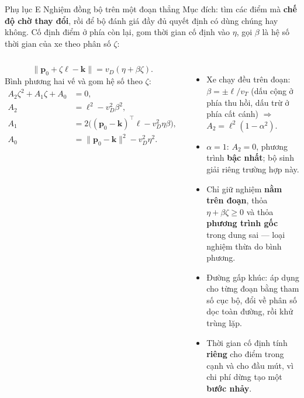 \documentclass[aspectratio=169,10pt,t,xcolor={table}]{beamer}
\newcommand{\apptitle}[2]{Phụ lục #1 \textperiodcentered{} #2}
\begin{document}
\begin{frame}{\apptitle{E}{Nghiệm đồng bộ trên một đoạn thẳng}}
\footnotesize
Mục đích: tìm các điểm mà \textbf{chế độ chờ thay đổi}, rồi để bộ đánh giá đầy đủ quyết định có dùng chúng hay không. Cố định điểm ở phía còn lại, gom thời gian cố định vào $\eta$, gọi $\beta$ là hệ số thời gian của xe theo phân số $\zeta$:
\begin{columns}[T,onlytextwidth]
\[
\|\mathbf p_0+\zeta\boldsymbol\ell-\mathbf k\|=v_D(\eta+\beta\zeta).
\]
Bình phương hai vế và gom hệ số theo $\zeta$:
\[
\begin{aligned}
A_2\zeta^2+A_1\zeta+A_0&=0,\\
A_2&=\ell^2-v_D^2\beta^2,\\
A_1&=2\bigl((\mathbf p_0-\mathbf k)^\top\boldsymbol\ell-v_D^2\eta\beta\bigr),\\
A_0&=\|\mathbf p_0-\mathbf k\|^2-v_D^2\eta^2.
\end{aligned}
\]
\begin{itemize}\scriptsize
\item Xe chạy đều trên đoạn: $\beta=\pm\ell/v_T$ (dấu cộng ở phía thu hồi, dấu trừ ở phía cất cánh) $\Rightarrow$ $A_2=\ell^2(1-\alpha^2)$.
\item $\alpha=1$: $A_2=0$, phương trình \textbf{bậc nhất}; bộ sinh giải riêng trường hợp này.
\item Chỉ giữ nghiệm \textbf{nằm trên đoạn}, thỏa $\eta+\beta\zeta\ge0$ và thỏa \textbf{phương trình gốc} trong dung sai --- loại nghiệm thừa do bình phương.
\item Đường gấp khúc: áp dụng cho từng đoạn bằng tham số cục bộ, đổi về phân số dọc toàn đường, rồi khử trùng lặp.
\item Thời gian cố định tính \textbf{riêng} cho điểm trong cạnh và cho đầu mút, vì chi phí dừng tạo một \textbf{bước nhảy}.
\end{itemize}
\end{columns}
\end{frame}
\end{document}
